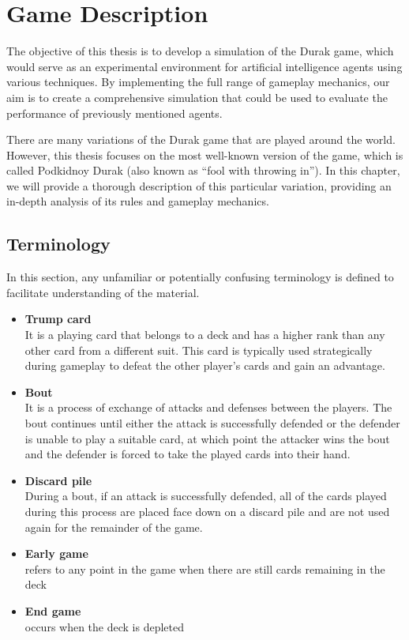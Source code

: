 \chapter{Game Description}
\label{GameDescription}
The objective of this thesis is to develop a simulation of the Durak game, which would serve as an experimental environment for artificial intelligence agents using various techniques. By implementing the full range of gameplay mechanics, our aim is to create a comprehensive simulation that could be used to evaluate the performance of previously mentioned agents.

There are many variations of the Durak game that are played around the world. However, this thesis focuses on the most well-known version of the game, which is called Podkidnoy Durak (also known as ``fool with throwing in'')\citep*{website:PAGAT_PODKIDNOY_DURAK}. In this chapter, we will provide a thorough description of this particular variation, providing an in-depth analysis of its rules and gameplay mechanics.

\section{Terminology}
In this section, any unfamiliar or potentially confusing terminology is defined to facilitate understanding of the material.

\begin{itemize}


        \item \textbf{Trump card} \\
        It is a playing card that belongs to a deck and has a higher rank than any other card from a different suit. This card is typically used strategically during gameplay to defeat the other player's cards and gain an advantage.
        \item \textbf{Bout} \\
         It is a process of exchange of attacks and defenses between the players. The bout continues until either the attack is successfully defended or the defender is unable to play a suitable card, at which point the attacker wins the bout and the defender is forced to take the played cards into their hand.
        \item \textbf{Discard pile} \\
         During a bout, if an attack is successfully defended, all of the cards played during this process are placed face down on a discard pile and are not used again for the remainder of the game.
		
		\item \textbf{Early game} \\
		refers to any point in the game when there are still cards remaining in the deck
		
		\item \textbf{End game} \\
		occurs when the deck is depleted
\end{itemize}

